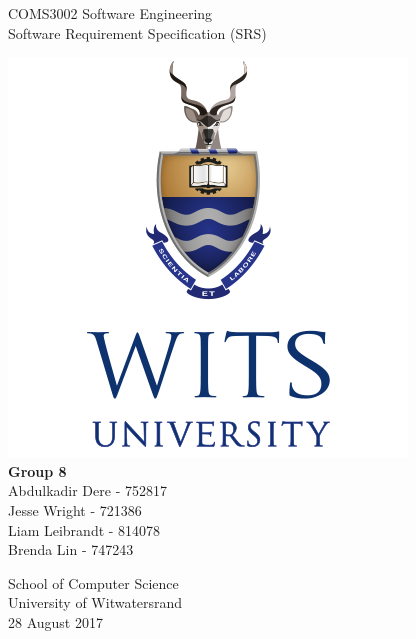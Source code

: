 \documentclass{article}
\begin{document}
\begin{titlepage}
    \begin{center}
        \vspace*{1cm}
        \huge COMS3002 Software Engineering \\
        \LARGE Software Requirement Specification (SRS)
        
		\vspace{1.5cm}        
		
		\includegraphics[scale=0.5]{witsLogo.png} \\		
		\vspace{1.5cm}
        \textbf{Group 8} \\
        \large Abdulkadir Dere - 752817\\
        Jesse Wright - 721386 \\
        Liam Leibrandt - 814078\\
        Brenda Lin - 747243 \\
        
		\vspace{1.5cm} 
		       
                
        School of Computer Science\\
        University of Witwatersrand\\
        28 August 2017
        
    \end{center}
\end{titlepage}

\tableofcontents

\pagebreak
\end{document}
